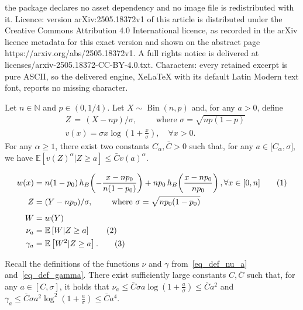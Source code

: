 \documentclass[10pt,a4paper]{amsart}
\newcommand\numberthis{\addtocounter{equation}{1}\tag{\theequation}}
\begin{document}
the package declares no asset dependency and no image file is redistributed with it. Licence: version arXiv:2505.18372v1 of this article is distributed under the Creative Commons Attribution 4.0 International licence, as recorded in the arXiv licence metadata for this exact version and shown on the abstract page https://arxiv.org/abs/2505.18372v1. A full rights notice is delivered at licenses/arxiv-2505.18372-CC-BY-4.0.txt. Characters: every retained excerpt is pure ASCII, so the delivered engine, XeLaTeX with its default Latin Modern text font, reports no missing character.
\begin{lemma}\label{lemma17_LiuGaoSamworth}
Let $n \in \mathbb N$ and $p \in (0,1/4)$. 
Let $X \sim \operatorname{Bin}(n,p)$ and, for any $a>0$,  define 
\begin{align*}
    &Z \,=\, (X-np)/\sigma, \qquad \text{ where } \sigma = \sqrt{np(1-p)}\\
    &v(x)  = \sigma x \log\left(1+ \frac{x}{\sigma}\right), \quad \forall x > 0.
\end{align*}
For any $\alpha\geq 1$, there exist two constants $C_\alpha, \bar C>0$ such that, for any $a \in\big[C_\alpha, \sigma\big]$, we have $\mathbb E\left[v(Z)^{\alpha} \big|Z\geq a\right] \leq \bar C v(a)^{\alpha}$. %
\end{lemma}

\begin{align*}
    w(x) &= n(1-p_0) \, h_B\!\left(-\frac{x-np_0}{n(1-p_0)}\right) + np_0 \, h_B\!\left(\frac{x-np_0}{np_0}\right), \forall x \in [0, n]\numberthis \label{eq_def_W_appendix}\\
    Z &= (Y - np_0)/\sigma, \qquad \text{ where } \sigma = \sqrt{np_0(1-p_0)}\\[5pt]
    W &= w(Y)\\
    \nu_a &=  \mathbb 
    E\left[W| Z \geq a\right]\numberthis \label{eq_def_nu_a}\\
\gamma_a &= \mathbb E\left[W^2 | Z \geq a\right].\numberthis\label{eq_def_gamma}
\end{align*}

\begin{corollary}\label{cor_lemma17_LiuGaoSamworth}
    Recall the definitions of the functions $\nu$ and $\gamma$ from~\eqref{eq_def_nu_a} and~\eqref{eq_def_gamma}. There exist sufficiently large constants $C, \bar C$ such that, for any $a \in [C, \sigma]$, it holds that $\nu_a \leq \bar C \sigma a \log\left(1+\frac{a}{\sigma}\right) \leq \bar C a^2$ and $\gamma_a \leq \bar C \sigma a^2 \log^2\left(1+\frac{a}{\sigma}\right) \leq \bar C a^4$.
\end{corollary}
\end{document}
